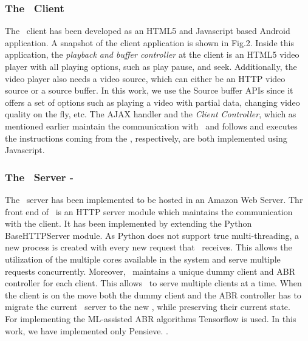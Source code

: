


\subsubsection{The \bel\ Client}
The \bel\ client has been developed as an HTML5 and Javascript based Android application. A snapshot of the client application is shown in Fig.2. Inside this application, the \textit{playback and buffer controller} at the client is an HTML5 video player with all playing options, such as play pause, and seek. Additionally, the video player also needs a video source, which can either be an HTTP video source or a source buffer. In this work, we use the Source buffer APIs since it offers a set of options  such as playing a video with partial data, changing video quality on the fly, etc. The  AJAX handler and the \textit{Client Controller}, which as mentioned earlier maintain the communication with \servname\  and follows and executes the instructions coming from the \servname, respectively, are both implemented using Javascript. 
\subsubsection{The \bel\ Server - \servname}
The \servname\ server has been implemented to be hosted in an Amazon Web Server. Thr front end of \servname\ is an HTTP server module which maintains the communication with the client.  It has been implemented by extending the Python BaseHTTPServer module. As Python does not support true multi-threading, a new process is created with every new request that \servname\ receives. This allows the utilization of the multiple cores available in the system and serve multiple requests concurrently. Moreover, \servname\ maintains a unique dummy client and \ac{ABR} controller for each client. This allows \servname\ to serve multiple clients at a time. When the client is on the move both the dummy client and the \ac{ABR} controller has to migrate the current \servname\ server to the new \servname, while preserving their current state.\\
\indent For implementing the ML-assisted \ac{ABR} algorithms Tensorflow is used. In this work, we have implemented only Pensieve. .
